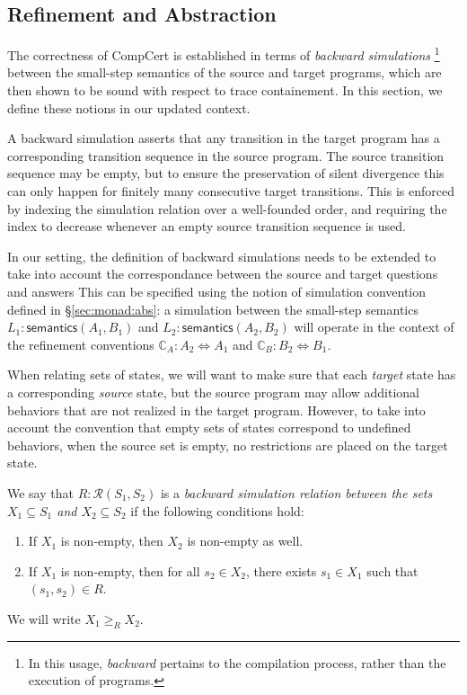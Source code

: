 \documentclass[acmsmall,timestamp,review,anonymous]{acmart}
\newcommand{\kw}[1]{\ensuremath{ \mathsf{#1} }}
\begin{document}

\subsection{Refinement and Abstraction} \label{sec:modsem:sim} %
\label{sec:modsem:ref}

The correctness of CompCert is established in terms of
\emph{backward simulations}%
\footnote{In this usage, \emph{backward} pertains to
  the compilation process,
  rather than the execution of programs.}
between the small-step semantics of the source and target programs,
which are then shown to be sound with respect to trace containement.
In this section,
we define these notions in our updated context.

A backward simulation asserts that any transition in the target program
has a corresponding transition sequence in the source program.
The source transition sequence may be empty,
but to ensure the preservation of silent divergence
this can only happen for finitely many consecutive target transitions.
This is enforced by indexing the simulation relation
over a well-founded order,
and requiring the index to decrease
whenever an empty source transition sequence is used.

In our setting,
the definition of backward simulations needs to be extended
to take into account the correspondance between
the source and target questions and answers
This can be specified using the notion of simulation convention
defined in \S\ref{sec:monad:abs}:
a simulation between the small-step semantics
$L_1 : \kw{semantics}(A_1, B_1)$ and
$L_2 : \kw{semantics}(A_2, B_2)$ will
operate in the context of the refinement conventions
$\mathbb{C}_A : A_2 \Leftrightarrow A_1$ and
$\mathbb{C}_B : B_2 \Leftrightarrow B_1$.

When relating sets of states,
we will want to make sure that
each \emph{target} state has a corresponding \emph{source} state,
but the source program may allow additional behaviors
that are not realized in the target program.
However, to take into account the convention that
empty sets of states correspond to undefined behaviors,
when the source set is empty,
no restrictions are placed on the target state.

\begin{definition}
We say that $R : \mathcal{R}(S_1, S_2)$ is a
\emph{backward simulation relation
  between the sets $X_1 \subseteq S_1$ and  $X_2 \subseteq S_2$}
if the following conditions hold:
\begin{enumerate}
\item
  If $X_1$ is non-empty,
  then $X_2$ is non-empty as well.
\item
  If $X_1$ is non-empty,
  then for all $s_2 \in X_2$,
  there exists $s_1 \in X_1$
  such that $(s_1, s_2) \in R$.
\end{enumerate}
We will write $X_1 \ge_R X_2$.
\end{definition}
\end{document}
